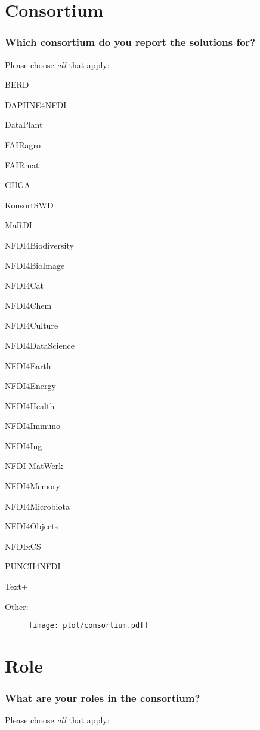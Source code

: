 \documentclass[headsepline,titlepage,twoside,12pt,toc=flat,headings=normal]{scrreprt}
\newcommand{\question}[1]{\subsubsection{#1}}
\newcommand{\otherbox}{\fbox{\phantom{This is how big an answer would be.}}}
\begin{document}
\section{Consortium}

\question{Which consortium do you report the solutions for?}

Please choose \emph{all} that apply:

\begin{answers}
\item BERD
\item DAPHNE4NFDI
\item DataPlant
\item \ac{FAIRagro}
\item \ac{FAIRmat}
\item \ac{GHGA}
\item KonsortSWD
\item \ac{MaRDI}
\item NFDI4Biodiversity
\item NFDI4BioImage
\item NFDI4Cat
\item NFDI4Chem
\item NFDI4Culture
\item NFDI4DataScience
\item NFDI4Earth
\item NFDI4Energy
\item NFDI4Health
\item NFDI4Immuno
\item NFDI4Ing
\item NFDI-MatWerk
\item NFDI4Memory
\item NFDI4Microbiota
\item NFDI4Objects
\item NFDIxCS
\item \ac{PUNCH}4NFDI
\item Text+
\item Other: \otherbox
\end{answers}

\begin{figure}[h!]
\texttt{[image: plot/consortium.pdf]}
\caption{}
\label{fig:consortium}
\end{figure}

\newpage
\section{Role}

\question{What are your roles in the consortium?}
Please choose \emph{all} that apply:
\end{document}
